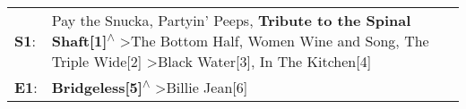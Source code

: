\begin{supertabular}{p{0.03\textwidth}p{0.92\textwidth}}
 \textbf{S1}:  &  Pay the Snucka\textsuperscript{}, \enspace Partyin' Peeps\textsuperscript{}, \enspace \textbf{Tribute to the Spinal Shaft[1]\textsuperscript{$\wedge$}} \textgreater \enspace The Bottom Half\textsuperscript{}, \enspace Women Wine and Song\textsuperscript{}, \enspace The Triple Wide[2]\textsuperscript{} \textgreater \enspace Black Water[3]\textsuperscript{}, \enspace In The Kitchen[4]\textsuperscript{}  \enspace  \\
 \textbf{E1}:  &                                                                                                                                                                                                                                                                                                              \textbf{Bridgeless[5]\textsuperscript{$\wedge$}} \textgreater \enspace Billie Jean[6]\textsuperscript{}  \enspace  \\
\end{supertabular}
